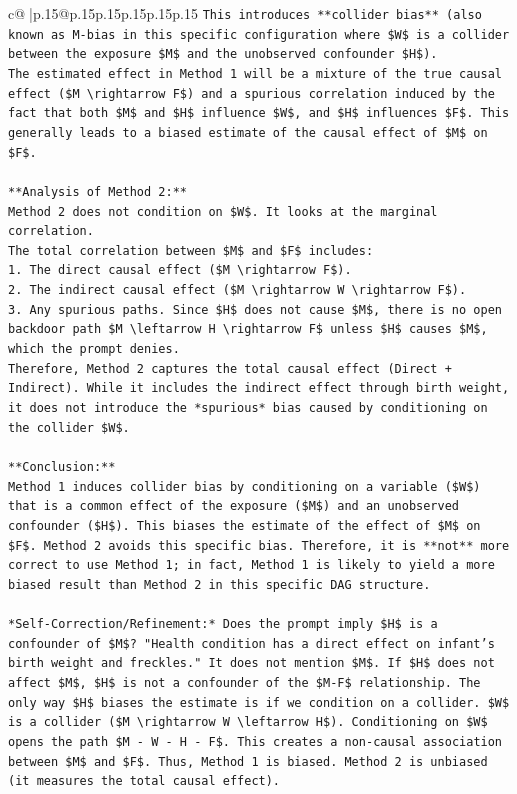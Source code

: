 \documentclass{article}
\begin{document}
{\begin{supertabular}{c@{$\;$}|p{.15\linewidth}@{}p{.15\linewidth}p{.15\linewidth}p{.15\linewidth}p{.15\linewidth}p{.15\linewidth}}
{{{\texttt{This introduces **collider bias** (also known as M{-}bias in this specific configuration where \$W\$ is a collider between the exposure \$M\$ and the unobserved confounder \$H\$).} \\
\texttt{The estimated effect in Method 1 will be a mixture of the true causal effect (\$M \textbackslash{}rightarrow F\$) and a spurious correlation induced by the fact that both \$M\$ and \$H\$ influence \$W\$, and \$H\$ influences \$F\$. This generally leads to a biased estimate of the causal effect of \$M\$ on \$F\$.} \\
\\ 
\texttt{**Analysis of Method 2:**} \\
\texttt{Method 2 does not condition on \$W\$. It looks at the marginal correlation.} \\
\texttt{The total correlation between \$M\$ and \$F\$ includes:} \\
\texttt{1.  The direct causal effect (\$M \textbackslash{}rightarrow F\$).} \\
\texttt{2.  The indirect causal effect (\$M \textbackslash{}rightarrow W \textbackslash{}rightarrow F\$).} \\
\texttt{3.  Any spurious paths. Since \$H\$ does not cause \$M\$, there is no open backdoor path \$M \textbackslash{}leftarrow H \textbackslash{}rightarrow F\$ unless \$H\$ causes \$M\$, which the prompt denies.} \\
\texttt{Therefore, Method 2 captures the total causal effect (Direct + Indirect). While it includes the indirect effect through birth weight, it does not introduce the *spurious* bias caused by conditioning on the collider \$W\$.} \\
\\ 
\texttt{**Conclusion:**} \\
\texttt{Method 1 induces collider bias by conditioning on a variable (\$W\$) that is a common effect of the exposure (\$M\$) and an unobserved confounder (\$H\$). This biases the estimate of the effect of \$M\$ on \$F\$. Method 2 avoids this specific bias. Therefore, it is **not** more correct to use Method 1; in fact, Method 1 is likely to yield a more biased result than Method 2 in this specific DAG structure.} \\
\\ 
\texttt{*Self{-}Correction/Refinement:* Does the prompt imply \$H\$ is a confounder of \$M\$? "Health condition has a direct effect on infant's birth weight and freckles." It does not mention \$M\$. If \$H\$ does not affect \$M\$, \$H\$ is not a confounder of the \$M{-}F\$ relationship. The only way \$H\$ biases the estimate is if we condition on a collider. \$W\$ is a collider (\$M \textbackslash{}rightarrow W \textbackslash{}leftarrow H\$). Conditioning on \$W\$ opens the path \$M {-} W {-} H {-} F\$. This creates a non{-}causal association between \$M\$ and \$F\$. Thus, Method 1 is biased. Method 2 is unbiased (it measures the total causal effect).} \\
}}}
\end{supertabular}}
\end{document}
